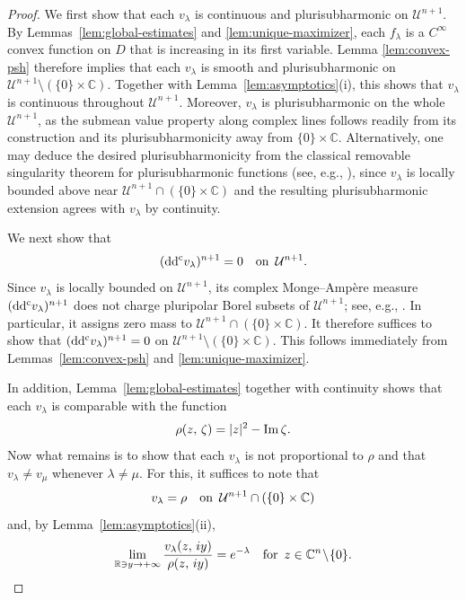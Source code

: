 \documentclass[12pt,a4paper]{amsart}
\numberwithin{equation}{section}
\theoremstyle{definition}
\newcommand{\ddc}{{\rm dd^c}}
\begin{document}
\begin{proof}
We first show that each $v_{\lambda}$ is continuous and plurisubharmonic  on $\mathcal{U}^{n+1}$. By Lemmas~\ref{lem:global-estimates} and \ref{lem:unique-maximizer}, each $f_{\lambda}$ is a $C^{\infty}$ convex function on $D$ that is increasing in its first variable. Lemma \ref{lem:convex-psh} therefore implies that each $v_{\lambda}$ is smooth and plurisubharmonic on $\mathcal{U}^{n+1} \!\setminus\! (\{0\}\times\mathbb C)$.  Together with Lemma~\ref{lem:asymptotics}(i),  this shows that $v_{\lambda}$ is continuous throughout $\mathcal{U}^{n+1}$. Moreover, $v_{\lambda}$ is plurisubharmonic on the whole $\mathcal{U}^{n+1}$, as the submean value property along complex lines follows readily from its construction and its plurisubharmonicity away from $\{0\}\times\mathbb C$.  Alternatively, one may deduce the desired plurisubharmonicity from the classical removable singularity theorem for plurisubharmonic functions (see, e.g., \cite[Chapter I, Theorem 5.24]{Demaillybook}), since $v_\lambda$ is locally bounded above near $\mathcal{U}^{n+1}\cap(\{0\}\times\mathbb C)$ and the
resulting plurisubharmonic extension agrees with $v_\lambda$ by
continuity.

We next show that
   $$
    (\ddc v_{\lambda})^{n+1}=0 \quad {\rm on }\ \, \mathcal{U}^{n+1}.
   $$
Since $v_{\lambda}$ is locally bounded on $\mathcal{U}^{n+1}$, its complex Monge--Amp\`ere measure $(\ddc v_{\lambda})^{n+1}$ does not charge pluripolar Borel subsets of $\mathcal{U}^{n+1}$; see, e.g., \cite{Bedford82, GZ-MAeqnbook}. In particular, it assigns zero mass to $\mathcal{U}^{n+1}\cap(\{0\}\times\mathbb C)$. It therefore suffices to show that $(\ddc v_{\lambda})^{n+1}=0$ on $\mathcal{U}^{n+1} \!\setminus\! (\{0\}\times\mathbb C)$. This follows immediately from Lemmas~\ref{lem:convex-psh} and \ref{lem:unique-maximizer}.

In addition, Lemma~\ref{lem:global-estimates} together with continuity shows that each $v_{\lambda}$ is comparable with the function
    $$
    \rho(z,\, \zeta)=|z|^{2}-{\rm Im}\,\zeta.
    $$
Now what remains is to show that each $v_{\lambda}$ is not proportional to $\rho$ and that $v_{\lambda}\neq v_{\mu}$ whenever $\lambda\neq\mu$. For this, it suffices to note that
   $$
    v_{\lambda}=\rho \quad {\rm on }\ \, \mathcal{U}^{n+1}\cap(\{0\}\times\mathbb C)
   $$
and, by Lemma~\ref{lem:asymptotics}\textup{(ii)},
   $$
   \lim_{\mathbb R\ni y\to+\infty} \frac{v_{\lambda}(z,\, iy)}{\rho(z,\,iy)}=e^{-\lambda} \quad {\rm for}\ \,  z\in\mathbb C^{n} \!\setminus\! \{0\}.
   $$
\end{proof}
\end{document}
